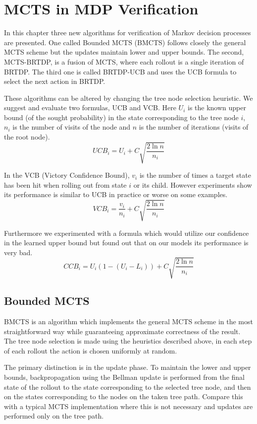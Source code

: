 \chapter{MCTS in MDP Verification}

In this chapter three new algorithms for verification of Markov decision
processes are presented. One called Bounded MCTS (BMCTS) follows
closely the general MCTS scheme but the updates maintain lower and upper
bounds. The second, MCTS-BRTDP, is a fusion of MCTS, where each
rollout is a single iteration of BRTDP.  The third one is called
BRTDP-UCB and uses the UCB formula to select the next action in BRTDP.

These algorithms can be altered by changing the tree node selection
heuristic. We suggest and evaluate two formulas, UCB and VCB. Here $U_i$
is the known upper bound (of the sought probability) in the state
corresponding to the tree node $i$, $n_i$ is the number of visits of the
node and $n$ is the number of iterations (visits of
the root node).
\begin{equation*}
    UCB_i = U_i + C \sqrt{ \frac{2 \ln n}{n_i} }
\end{equation*}

In the VCB (Victory Confidence Bound), $v_i$ is the number of times a
target state has been hit when rolling out from state $i$ or its child.
However experiments show its performance is similar to UCB in
practice or worse on some examples.
\[
    VCB_i = \frac{v_i}{n_i} + C \sqrt{ \frac{2 \ln n}{n_i} }
\]

Furthermore we experimented with a formula which would utilize our
confidence in the learned upper bound but found out that on our models
its performance is very bad.
\[
    CCB_i = U_i (1 - (U_i - L_i)) + C \sqrt{ \frac{2 \ln n}{n_i} }
\]

\pagebreak

\section{Bounded MCTS}

BMCTS is an algorithm which implements the general MCTS scheme in the
most straightforward way while guaranteeing approximate correctness of
the result.  The tree node selection is made using the heuristics
described above, in each step of each rollout the action is chosen
uniformly at random.

The primary distinction is in the update phase. To maintain the lower and
upper bounds, backpropagation using the Bellman update is performed
from the final state of the rollout to the state corresponding to
the selected tree node, and then on the states corresponding to the
nodes on the taken tree path. Compare this with a typical MCTS
implementation where this is not necessary and updates are performed
only on the tree path.

